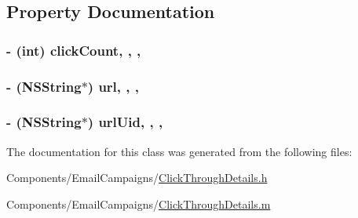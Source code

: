 \subsection{Property Documentation}
\hypertarget{interface_click_through_details_a686f45bf797fa7daedfb6626eddccd3a}{
\subsubsection[{click\-Count}]{\setlength{\rightskip}{0pt plus 5cm}-\/ (int) click\-Count\hspace{0.3cm}{\ttfamily [read]}, {\ttfamily [write]}, {\ttfamily [nonatomic]}, {\ttfamily [assign]}}}\label{interface_click_through_details_a686f45bf797fa7daedfb6626eddccd3a}
\hypertarget{interface_click_through_details_a3b99fa4774bd8eab8aac29488b59480b}{
\subsubsection[{url}]{\setlength{\rightskip}{0pt plus 5cm}-\/ (N\-S\-String$\ast$) url\hspace{0.3cm}{\ttfamily [read]}, {\ttfamily [write]}, {\ttfamily [nonatomic]}, {\ttfamily [strong]}}}\label{interface_click_through_details_a3b99fa4774bd8eab8aac29488b59480b}
\hypertarget{interface_click_through_details_a872fe75aab72a323e05459998bd703e2}{
\subsubsection[{url\-Uid}]{\setlength{\rightskip}{0pt plus 5cm}-\/ (N\-S\-String$\ast$) url\-Uid\hspace{0.3cm}{\ttfamily [read]}, {\ttfamily [write]}, {\ttfamily [nonatomic]}, {\ttfamily [strong]}}}\label{interface_click_through_details_a872fe75aab72a323e05459998bd703e2}


The documentation for this class was generated from the following files\-:\begin{DoxyCompactItemize}
\item 
Components/\-Email\-Campaigns/\hyperlink{_click_through_details_8h}{Click\-Through\-Details.\-h}\item 
Components/\-Email\-Campaigns/\hyperlink{_click_through_details_8m}{Click\-Through\-Details.\-m}\end{DoxyCompactItemize}
